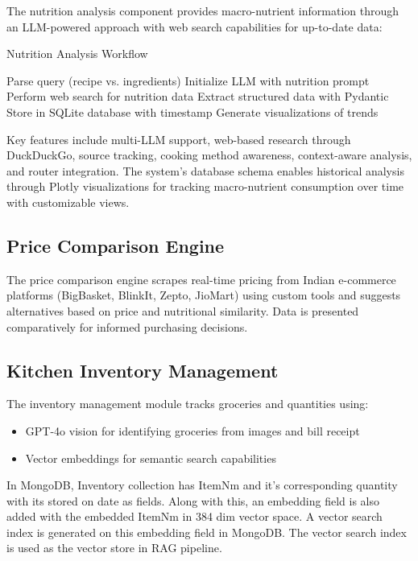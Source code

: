 \documentclass{ecai}
\begin{document}
The nutrition analysis component provides macro-nutrient information through an LLM-powered approach with web search capabilities for up-to-date data:

\begin{algorithm}
\caption{Nutrition Analysis Workflow}
\begin{algorithmic}[1]
\State Parse query (recipe vs. ingredients)
\State Initialize LLM with nutrition prompt
\State Perform web search for nutrition data
\State Extract structured data with Pydantic
\State Store in SQLite database with timestamp
\State Generate visualizations of trends
\end{algorithmic}
\end{algorithm}

Key features include multi-LLM support, web-based research through DuckDuckGo, source tracking, cooking method awareness, context-aware analysis, and router integration. The system's database schema enables historical analysis through Plotly visualizations for tracking macro-nutrient consumption over time with customizable views.

\subsection{Price Comparison Engine}

The price comparison engine scrapes real-time pricing from Indian e-commerce platforms (BigBasket, BlinkIt, Zepto, JioMart) using custom tools and suggests alternatives based on price and nutritional similarity. Data is presented comparatively for informed purchasing decisions.

\subsection{Kitchen Inventory Management}

The inventory management module tracks groceries and quantities using:
\begin{itemize}[noitemsep,topsep=0pt]
    \item GPT-4o vision for identifying groceries from images and bill receipt
    \item Vector embeddings for semantic search capabilities
\end{itemize}

In MongoDB, Inventory collection has ItemNm and it’s corresponding quantity with its stored on date as fields. Along with this, an embedding field is also added with the embedded ItemNm in 384 dim vector space. A vector search index is generated on this embedding field in MongoDB. The vector search index is used as the vector store in RAG pipeline.
\end{document}

